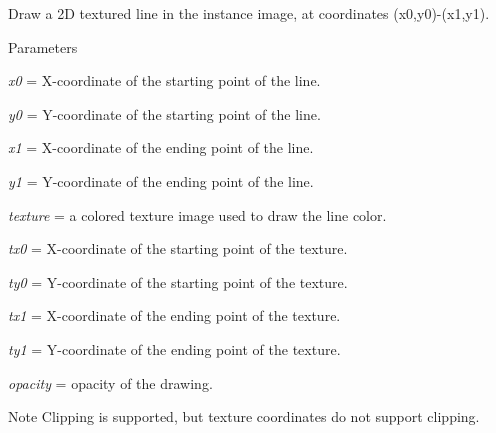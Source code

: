 Draw a 2D textured line in the instance image, at coordinates ({\ttfamily x0},{\ttfamily y0})-\/({\ttfamily x1},{\ttfamily y1}). 


\begin{DoxyParams}{Parameters}
\item[{\em x0}]= X-\/coordinate of the starting point of the line. \item[{\em y0}]= Y-\/coordinate of the starting point of the line. \item[{\em x1}]= X-\/coordinate of the ending point of the line. \item[{\em y1}]= Y-\/coordinate of the ending point of the line. \item[{\em texture}]= a colored texture image used to draw the line color. \item[{\em tx0}]= X-\/coordinate of the starting point of the texture. \item[{\em ty0}]= Y-\/coordinate of the starting point of the texture. \item[{\em tx1}]= X-\/coordinate of the ending point of the texture. \item[{\em ty1}]= Y-\/coordinate of the ending point of the texture. \item[{\em opacity}]= opacity of the drawing. \end{DoxyParams}
\begin{DoxyNote}{Note}
Clipping is supported, but texture coordinates do not support clipping. 
\end{DoxyNote}
